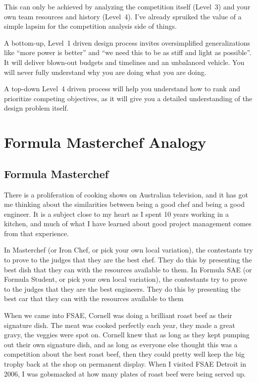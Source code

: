 \documentclass[10pt, a4paper, article, oneside, twocolumn, final]{memoir}
\begin{document}
This can only be achieved by analyzing the competition itself (Level~3) and your own team resources and history (Level~4). I've already spruiked the value of a simple lapsim for the competition analysis side of things. 

A bottom-up, Level~1 driven design process invites oversimplified generalizations like “more power is better” and “we need this to be as stiff and light as possible”. It will deliver blown-out budgets and timelines and an unbalanced vehicle. You will never fully understand why you are doing what you are doing. 

A top-down Level~4 driven process will help you understand how to rank and prioritize competing objectives, as it will give you a detailed understanding of the design problem itself. 



\chapter*{Formula Masterchef Analogy}

\section*{Formula Masterchef}

There is a proliferation of cooking shows on Australian television, and it has got me thinking about the similarities between being a good chef and being a good engineer. It is a subject close to my heart as I spent \num{10} years working in a kitchen, and much of what I have learned about good project management comes from that experience. 

In Masterchef (or Iron Chef, or pick your own local variation), the contestants try to prove to the judges that they are the best chef. They do this by presenting the best dish that they can with the resources available to them. In Formula SAE (or Formula Student, or pick your own local variation), the contestants try to prove to the judges that they are the best engineers. They do this by presenting the best car that they can with the resources available to them 

When we came into FSAE, Cornell was doing a brilliant roast beef as their signature dish. The meat was cooked perfectly each year, they made a great gravy, the veggies were spot on. Cornell knew that as long as they kept pumping out their own signature dish, and as long as everyone else thought this was a competition about the best roast beef, then they could pretty well keep the big trophy back at the shop on permanent display. When I visited FSAE Detroit in 2006, I was gobsmacked at how many plates of roast beef were being served up. 
\end{document}
